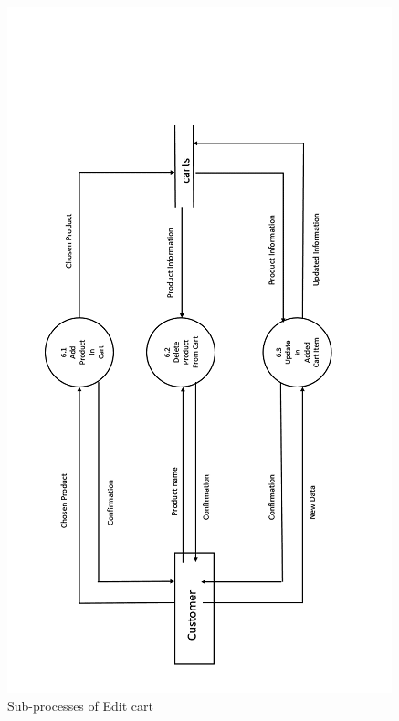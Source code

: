\begin{figure}
 \centering
\includegraphics{figures/6final.png}
\caption{Sub-processes of  Edit cart}
\end{figure}


